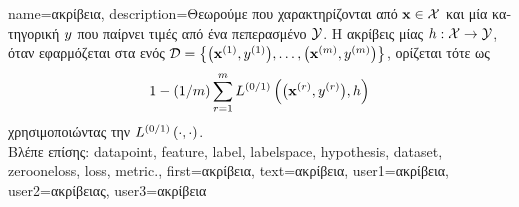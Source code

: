 {name={\foreignlanguage{greek}{ακρίβεια}},
	description={\foreignlanguage{greek}{Θεωρούμε} 
		 \foreignlanguage{greek}{που χαρακτηρίζονται από}  ${\bf x} \in \mathcal{X}$ 
		\foreignlanguage{greek}{και μία κατηγορική} 
		$y$ \foreignlanguage{greek}{που παίρνει τιμές από ένα πεπερασμένο}  $\mathcal{Y}$. 
		\foreignlanguage{greek}{Η ακρίβεις μίας}  
		$h: \mathcal{X} \rightarrow \mathcal{Y}$, \foreignlanguage{greek}{όταν εφαρμόζεται στα}  
		 \foreignlanguage{greek}{ενός}  
		$\mathcal{D} = \big\{ \big({\bf x}^{(1)}, y^{(1)} \big), \ldots, \big({\bf x}^{(m)},y^{(m)}\big) \big\}$, 
		\foreignlanguage{greek}{ορίζεται τότε ως} 
		$$1 - (1/m)\sum_{r=1}^{m} L^{(0/1)}\left(\big({\bf x}^{(r)},y^{(r)}\big),h \right)$$ 
		\foreignlanguage{greek}{χρησιμοποιώντας την}  $L^{(0/1)}\left(\cdot,\cdot \right)$.\\
		\foreignlanguage{greek}{Βλέπε επίσης:} \gls{datapoint}, \gls{feature}, \gls{label}, \gls{labelspace}, \gls{hypothesis}, \gls{dataset}, \gls{zerooneloss}, 
		\gls{loss}, \gls{metric}.},
	first={\foreignlanguage{greek}{ακρίβεια}},
	text={\foreignlanguage{greek}{ακρίβεια}},
	user1={\foreignlanguage{greek}{ακρίβεια}}, %
	user2={\foreignlanguage{greek}{ακρίβειας}}, %
	user3={\foreignlanguage{greek}{ακρίβεια}} %
}

